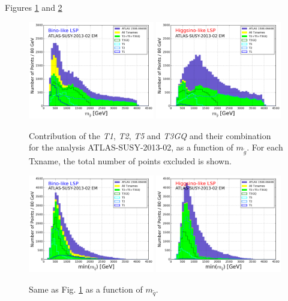 \documentclass[a4paper,11pt]{article}
\newcommand{\MSQ}{$ m _{ \tilde q } $\xspace}
\newcommand{\MGLU}{$ m _{ \tilde g } $\xspace}
\begin{document}
%
%
Figures \ref{combination_gluino} and \ref{combination_squark} 
\begin{figure}[!b]
\begin{center}
\subfigure
\includegraphics[width=0.49\textwidth]{PLOTS/BINO_Txnames_Contribution_ATLAS02_Gluino.png}
\subfigure
{\includegraphics[width=0.49\textwidth]{PLOTS/HIGGSINO_Txnames_Contribution_ATLAS02_Gluino.png}}
\end{center}
\caption{Contribution of the \textit{T1}, \textit{T2}, \textit{T5} and \textit{T3GQ} and their combination for the analysis ATLAS-SUSY-2013-02, as a function of \MGLU. For each Txname, the total number of points excluded is shown.} 
\label{combination_gluino}
%
\end{figure}
\begin{figure}[!]
\begin{center}
\subfigure
\includegraphics[width=0.49\textwidth]{PLOTS/BINO_Txnames_Contribution_ATLAS02_Squark.png}
\subfigure
{\includegraphics[width=0.49\textwidth]{PLOTS/HIGGSINO_Txnames_Contribution_ATLAS02_Squark.png}}
\end{center}
\caption{Same as Fig. \ref{combination_gluino} as a function of \MSQ.} 
\label{combination_squark}
\end{figure}
\end{document}
